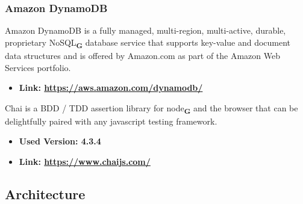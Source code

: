 \subsubsection{Amazon DynamoDB}
Amazon DynamoDB is a fully managed, multi-region, multi-active, durable, proprietary NoSQL\textsubscript{\textbf{G}} database service that supports key-value
and document data structures and is offered by Amazon.com as part of the Amazon Web Services
portfolio.
\begin{itemize}
    \item \textbf{Link: \url{https://aws.amazon.com/dynamodb/}}
\end{itemize}
Chai is a BDD / TDD assertion library for node\textsubscript{\textbf{G}} and the browser that can be delightfully paired with any javascript testing framework.
\begin{itemize}
    \item \textbf{Used Version: 4.3.4}
    \item \textbf{Link: \url{https://www.chaijs.com/}}
\end{itemize}
\subsection{Architecture}
